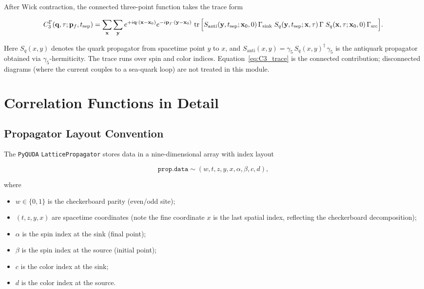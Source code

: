 \documentclass[11pt,a4paper]{article}
\newcommand{\gfive}{\gamma_5}
\newcommand{\gsrc}{\Gamma_{\text{src}}}
\newcommand{\gsink}{\Gamma_{\text{sink}}}
\newcommand{\gcur}{\Gamma}
\newcommand{\Sq}{S_{q}}
\newcommand{\Santi}{S_{\text{anti}}}
\newcommand{\pyquda}{\texttt{PyQUDA}}
\begin{document}
After Wick contraction, the connected three-point function takes the trace form

\begin{equation}
C_3^\Gamma(\mathbf{q}, \tau; \mathbf{p}_f, t_{\text{sep}})
  = \sum_{\mathbf{x}} \sum_{\mathbf{y}}
    e^{+i\mathbf{q}\cdot(\mathbf{x}-\mathbf{x}_0)}
    e^{-i\mathbf{p}_f\cdot(\mathbf{y}-\mathbf{x}_0)} \,
    \tr\Big[
      \Santi(\mathbf{y}, t_{\text{sep}}; \mathbf{x}_0, 0) \,
      \gsink \;
      \Sq(\mathbf{y}, t_{\text{sep}}; \mathbf{x}, \tau) \,
      \gcur \;
      \Sq(\mathbf{x}, \tau; \mathbf{x}_0, 0) \,
      \gsrc
    \Big] .
\label{eq:C3_trace}
\end{equation}

Here \(\Sq(x, y)\) denotes the quark propagator from spacetime point \(y\) to
\(x\), and \(\Santi(x, y) = \gfive \, \Sq(x, y)^\dagger \, \gfive\) is the
antiquark propagator obtained via \(\gfive\)-hermiticity.  The trace runs over
spin and color indices.  Equation~\eqref{eq:C3_trace} is the connected
contribution; disconnected diagrams (where the current couples to a sea-quark
loop) are not treated in this module.


\section{Correlation Functions in Detail}

\subsection{Propagator Layout Convention}

The \pyquda{} \texttt{LatticePropagator} stores data in a nine-dimensional
array with index layout

\begin{equation}
\texttt{prop.data} \sim (w, t, z, y, x, \alpha, \beta, c, d) ,
\label{eq:data_layout}
\end{equation}

where
\begin{itemize}[nosep]
  \item \(w \in \{0,1\}\) is the checkerboard parity (even/odd site);
  \item \((t, z, y, x)\) are spacetime coordinates (note the fine coordinate
        \(x\) is the last spatial index, reflecting the checkerboard
        decomposition);
  \item \(\alpha\) is the spin index at the sink (final point);
  \item \(\beta\) is the spin index at the source (initial point);
  \item \(c\) is the color index at the sink;
  \item \(d\) is the color index at the source.
\end{itemize}
\end{document}
